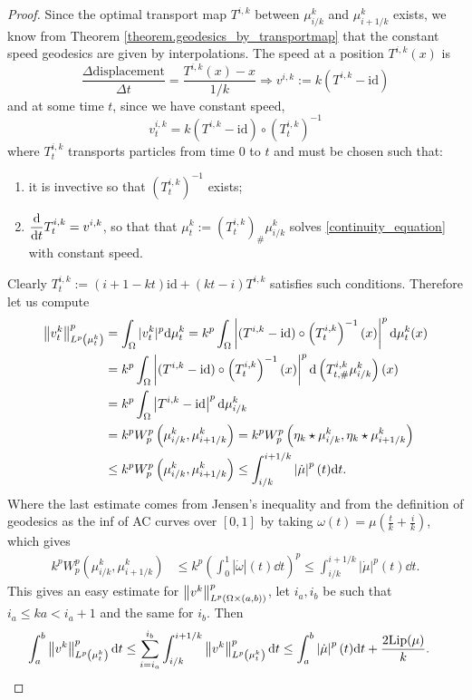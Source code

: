 \begin{proof}
	Since the optimal transport map $T^{i,k}$ between $\mu^k_{i/k}$ and $\mu^k_{i+1/k}$ exists, we know from Theorem \ref{theorem.geodesics_by_transportmap} that the constant speed geodesics are given by interpolations. The speed at a position $T^{i,k}(x)$ is
	$$
		\frac{\Delta \text{displacement}}{\Delta t} = \frac{T^{i,k}(x) - x}{1/k} \Rightarrow v^{i,k}:=k\left(T^{i,k} - \text{id}\right)
	$$
	and at some time $t$, since we have constant speed, 
	$$
		v^{i,k}_t = k\left(T^{i,k} - \text{id}\right)\circ \left(T^{i,k}_t\right)^{-1}
	$$
	where $T^{i,k}_t$ transports particles from time $0$ to $t$ and must be chosen such that:
	\begin{enumerate}
		\item it is invective so that $\left(T^{i,k}_t\right)^{-1}$ exists; 
		\item $\displaystyle \frac{{\rm d} }{{\rm d} t}T^{i,k}_t = v^{i,k}$, so that that $\mu^{k}_t := \left(T^{i,k}_t\right)_{\#}\mu^k_{i/k}$ solves \eqref{continuity_equation} with constant speed. 
	\end{enumerate}
	Clearly $T^{i,k}_t := (i+1 -kt)\text{id} + (kt - i)T^{i,k}$ satisfies such conditions. Therefore let us compute 
	\begin{align*}
		\left\lVert v^k_t\right\rVert^p_{L^p\left(\mu_t^k\right)} 
		&= \int_{\Omega} |v^k_t|^p{\rm d} \mu^k_t = k^p\int_{\Omega} \left|(T^{i,k} - \text{id})\circ \left(T^{i,k}_t\right)^{-1}(x)\right|^p{\rm d} \mu^k_t(x)\\
		&= k^p\int_{\Omega} \left|(T^{i,k} - \text{id})\circ\left(T^{i,k}_t\right)^{-1}(x)\right|^p{\rm d} \left(T^{i,k}_{t,\#}\mu^k_{i/k}\right)(x)\\
		&= k^p\int_{\Omega} \left|T^{i,k} - \text{id}\right|^p{\rm d}\mu^k_{i/k}\\
		&= k^pW_p^p\left(\mu^k_{i/k},\mu^k_{i+1/k}\right) = k^pW_p^p\left(\eta_k\star\mu^k_{i/k},\eta_k\star\mu^k_{i+1/k}\right)\\
		&\le k^pW_p^p\left(\mu^k_{i/k},\mu^k_{i+1/k}\right) \le 
		 \int_{i/k}^{i+1/k}\left|\dot{\mu}\right|^p(t){\rm d} t.
	\end{align*} Where the last estimate comes from Jensen's inequality and from the definition of geodesics as the inf of AC curves over $[0,1]$ by taking $\omega(t) = \mu\left(\frac{t}{k} + \frac{i}{k}\right)$, which gives 
	\begin{align*}
		k^pW_p^p\left(\mu^k_{i/k},\mu^k_{i+1/k}\right)
		&\le  k^p\left(\int_{0}^{1}\left|\dot{\omega}\right|(t)\dd t\right)^p \le \int_{i/k}^{i+1/k}\left|\dot{\mu}\right|^p(t)\dd t.
	\end{align*}
	This gives an easy estimate for  $\left\lVert v^k\right\rVert^p_{L^p(\Omega\times(a,b))}$, let $i_a, i_b$ be such that $i_a \le ka < i_a+1$ and the same for $i_b$. Then 
	\begin{align*}
		\int_a^b\left\lVert v^k\right\rVert^p_{L^p\left(\mu^k_t\right)}{\rm d} t  
		&\le 
		\sum_{i = i_a}^{i_b} \int_{i/k}^{i+1/k}\left\lVert v^k\right\rVert^p_{L^p\left(\mu^k_t\right)}{\rm d} t
		\le \int_a^b\left|\dot{\mu}\right|^p(t){\rm d} t + \frac{2\text{Lip}(\mu)}{k}. 
	\end{align*}
	

\end{proof}
